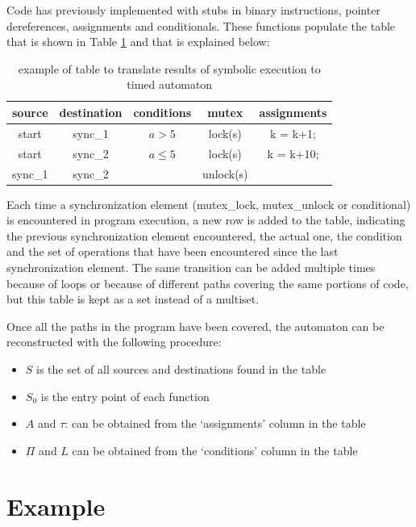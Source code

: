 \documentclass[conference]{IEEEtran}
\begin{document}
Code has previously implemented with stubs in binary instructions, pointer dereferences, assignments and conditionals. These functions populate the table that is shown in Table \ref{tab:my_label} and that is explained below:


\begin{table}[!h]
\centering
\caption{example of table to translate results of symbolic execution to timed automaton}
\begin{tabular}{ccccc}
source  & destination & conditions    & mutex       & assignments \\\hline
start   & sync\_1     & $a > 5$       & lock(s)     & k = k+1;    \\
start   & sync\_2     & $a \leq 5$    & lock(s)     & k = k+10;    \\
sync\_1 & sync\_2     &               & unlock(s)   &              \\
\end{tabular}
\label{tab:my_label}
\end{table}



Each time a synchronization element (mutex\_lock, mutex\_unlock or conditional) is encountered in program execution, a new row is added to the table, indicating the previous synchronization element encountered, the actual one, the condition and the set of operations that have been encountered since the last synchronization element. The same transition can be added multiple times because of loops or because of different paths covering the same portions of code, but this table is kept as a set instead of a multiset.

Once all the paths in the program have been covered, the automaton can be reconstructed with the following procedure:





\begin{itemize}
    \item $S$ is the set of all sources and destinations found in the table
    \item $S_0$ is the entry point of each function
    \item $A$ and $\tau$: can be obtained from the `assignments' column in the table
    \item $\Pi$ and $L$ can be obtained from the `conditions' column in the table
\end{itemize}

\section{Example}
\end{document}
